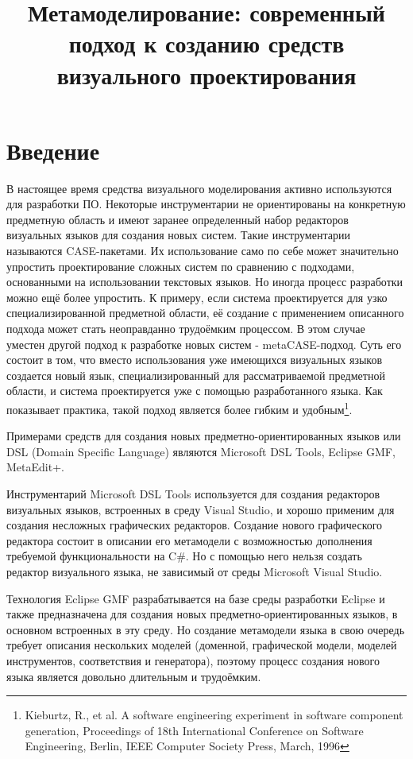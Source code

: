 \documentclass[a4paper]{article}
\title{Метамоделирование: современный подход к созданию средств визуального проектирования}
\date{}
\begin{document}
\maketitle
\thispagestyle{empty}

\section*{Введение}
В настоящее время средства визуального моделирования активно используются для разработки ПО. Некоторые инструментарии не ориентированы на конкретную предметную область и имеют заранее определенный набор редакторов визуальных языков для создания новых систем. Такие инструментарии называются CASE-пакетами. Их использование само по себе может значительно упростить проектирование сложных систем по сравнению с подходами, основанными на использовании текстовых языков. Но иногда процесс разработки можно ещё более упростить. К примеру, если система проектируется для узко специализированной предметной области, её создание с применением описанного подхода может стать неоправданно трудоёмким процессом. В этом случае уместен другой подход к разработке новых систем - metaCASE-подход. Суть его состоит в том, что вместо использования уже имеющихся визуальных языков создается новый язык, специализированный для рассматриваемой предметной области, и система проектируется уже с помощью разработанного языка. Как показывает практика, такой подход является более гибким и удобным\footnote{Kieburtz, R., et al. A software engineering experiment in software component generation, Proceedings of 18th International Conference on Software Engineering, Berlin, IEEE Computer Society Press, March, 1996}.

Примерами средств для создания новых предметно-ориентированных языков или DSL (Domain Specific Language) являются Microsoft DSL Tools, Eclipse GMF, MetaEdit+.

Инструментарий Microsoft DSL Tools используется для создания редакторов визуальных языков, встроенных в среду Visual Studio, и хорошо применим для создания несложных графических редакторов. Создание нового графического редактора состоит в описании его метамодели с возможностью дополнения требуемой функциональности на C\#. Но с помощью него нельзя создать редактор визуального языка, не зависимый от среды Microsoft Visual Studio.

Технология Eclipse GMF разрабатывается на базе среды разработки Eclipse и также предназначена для создания новых предметно-ориентированных языков, в основном встроенных в эту среду. Но создание метамодели языка в свою очередь требует описания нескольких моделей (доменной, графической модели, моделей инструментов, соответствия и генератора), поэтому процесс создания нового языка является довольно длительным и трудоёмким.
\end{document}
